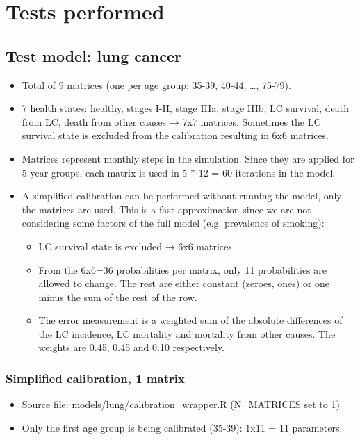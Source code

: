 \chapter{Tests performed} %

\label{sec:tests} %

\section{Test model: lung cancer}

\begin{itemize}
	\item Total of 9 matrices (one per age group: 35-39, 40-44, …, 75-79).
	\item 7 health states: healthy, stages I-II, stage IIIa, stage IIIb, LC survival, death from LC, death from other causes → 7x7 matrices. Sometimes the LC survival state is excluded from the calibration resulting in 6x6 matrices.
	\item Matrices represent monthly steps in the simulation. Since they are applied for 5-year groups, each matrix is used in 5 * 12 = 60 iterations in the model.
	\item A simplified calibration can be performed without running the model, only the matrices are used. This is a fast approximation since we are not considering some factors of the full model (e.g. prevalence of smoking):
	\begin{itemize}
		\item LC survival state is excluded → 6x6 matrices
		\item From the 6x6=36 probabilities per matrix, only 11 probabilities are allowed to change. The rest are either constant (zeroes, ones) or one minus the sum of the rest of the row.
		\item The error measurement is a weighted sum of the absolute differences of the LC incidence, LC mortality and mortality from other causes. The weights are 0.45, 0.45 and 0.10 respectively.
	\end{itemize}
\end{itemize}

\subsection{Simplified calibration, 1 matrix}

\begin{itemize}
	\item Source file: models/lung/calibration\_wrapper.R (N\_MATRICES set to 1)
	\item Only the first age group is being calibrated (35-39): 1x11 = 11 parameters.
\end{itemize}


